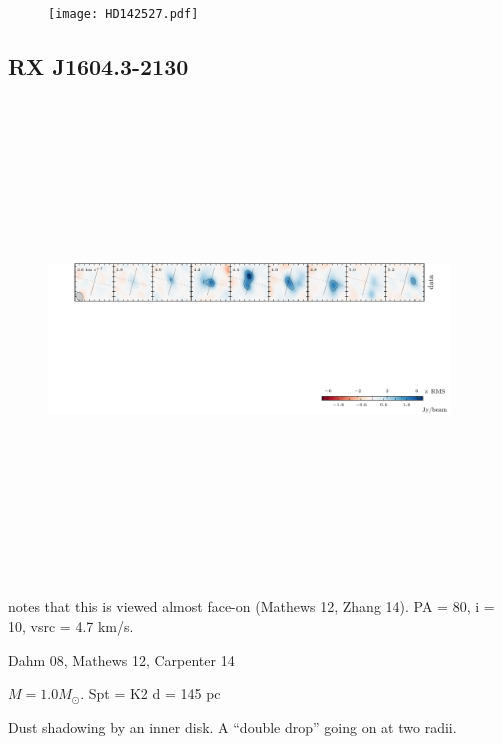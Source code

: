 \documentclass[twocolumn]{aastex6}
\begin{document}
\begin{figure}[htb]
\begin{center}
  \texttt{[image: HD142527.pdf]}
  \end{center}
\end{figure}

\subsection{RX J1604.3-2130}

\begin{figure}[htb]
\begin{center}
  \includegraphics[draft, width=0.95\textwidth, height=5in]{RXJ1604.pdf}
  \end{center}
\end{figure}

\citep{vandermarel15} notes that this is viewed almost face-on (Mathews 12, Zhang 14). PA = 80, i = 10, vsrc = 4.7 km/s.

Dahm 08, Mathews 12, Carpenter 14

$M = 1.0 M_\odot$.
Spt = K2
d = 145 pc

Dust shadowing by an inner disk. A ``double drop'' going on at two radii.
\end{document}
